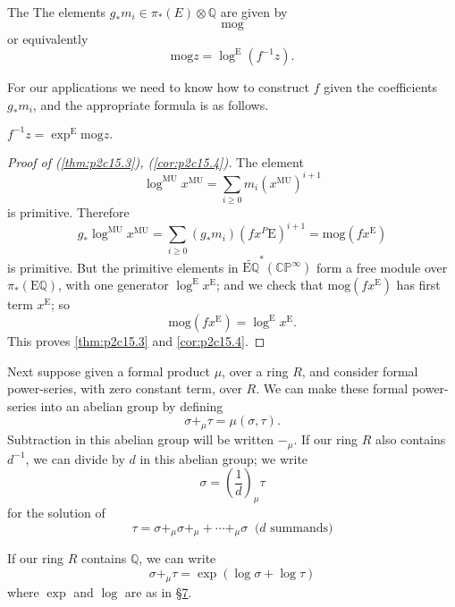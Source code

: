 \documentclass[../main]{subfiles}
\begin{document}
\begin{proposition}
\label{thm:p2c15.3}
The The elements $g_\ast m_i\in\pi_\ast(E)\otimes\mathbb{Q}$ are given by $$\mathrm{mog}$$ or equivalently $$\mathrm{mog}z=\log^{\mathrm{E}}(f^{-1}z).$$
\end{proposition}
For our applications we need to know how to construct $f$ given the coefficients $g_\ast m_i$, and the appropriate formula is as follows.
\begin{corollary}
\label{cor:p2c15.4}
$f^{-1}z=\exp^{\mathrm{E}}\mathrm{mog}z.$
\end{corollary} 
\begin{proof}[Proof of (\ref{thm:p2c15.3}), (\ref{cor:p2c15.4})]
The element $$\log^{\mathrm{MU}}x^{\mathrm{MU}}=\sum_{i\geq0}m_i(x^{\mathrm{MU}})^{i+1}$$ is primitive. Therefore $$g_\ast \log^{\mathrm{MU}}x^{\mathrm{MU}}=\sum_{i\geq0}(g_\ast m_i)(fx^P\mathrm{E})^{i+1}=\mathrm{mog}(fx^{\mathrm{E}})$$ is primitive. But the primitive elements in $\tilde{\mathrm{E}\mathbb{Q}}^\ast(\mathbb{CP}^\infty)$ form a free module over $\pi_\ast(\mathrm{E}\mathbb{Q})$, with one generator $\log^{\mathrm{E}}x^{\mathrm{E}}$; and we check that $\mathrm{mog}(fx^{\mathrm{E}})$ has first term $x^{\mathrm{E}}$; so $$\mathrm{mog}(fx^{\mathrm{E}})=\log^{\mathrm{E}} x^{\mathrm{E}}.$$ This proves \eqref{thm:p2c15.3} and \eqref{cor:p2c15.4}.
\end{proof}

Next suppose given a formal product $\mu$, over a ring $R$, and consider formal power-series, with zero constant term, over $R$. We can make these formal power-series into an abelian group by defining $$\sigma+_\mu\tau=\mu(\sigma,\tau).$$ Subtraction in this abelian group will be written $-_\mu$. If our ring $R$ also contains $d^{-1}$, we can divide by $d$ in this abelian group; we write $$\sigma=\left(\frac1d\right)_\mu\tau$$ for the solution of $$\tau=\sigma+_\mu\sigma+_\mu+\cdots+_\mu\sigma\:\text{ ($d$ summands)}$$

If our ring $R$ contains $\mathbb{Q}$, we can write $$\sigma+_\mu\tau=\exp(\log\sigma+\log\tau)$$ where $\exp$ and $\log$ are as in \hyperref[sec:p2c7]{\S 7}.
\end{document}
